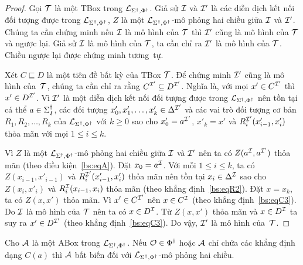 \begin{proof}
	Gọi $\mathcal{T}$ là một TBox trong $\mathcal{L}_{\Sigma^\dag,\Phi^\dag}$. Giả sử $\mathcal{I}$ và $\mathcal{I}'$ là các diễn dịch kết nối đối tượng được trong $\mathcal{L}_{\Sigma^\dag,\Phi^\dag}$, $Z$ là một $\mathcal{L}_{\Sigma^\dag,\Phi^\dag}$-mô phỏng hai chiều giữa $\mathcal{I}$ và $\mathcal{I}'$. Chúng ta cần chứng minh nếu $\mathcal{I}$ là mô hình của $\mathcal{T}$ thì $\mathcal{I}'$ cũng là mô hình của $\mathcal{T}$ và ngược lại. Giả sử $\mathcal{I}$ là mô hình của $\mathcal{T}$, ta cần chỉ ra $\mathcal{I}'$ là mô hình của $\mathcal{T}$. Chiều ngược lại được chứng minh tương~tự.
	
	Xét $C \sqsubseteq D$ là một tiên đề bất kỳ của TBox $\mathcal{T}$. Để chứng minh $\mathcal{I}'$ cũng là mô hình của~$\mathcal{T}$, chúng ta cần chỉ ra rằng $C^{\mathcal{I}'} \subseteq D^{\mathcal{I}'}$. Nghĩa là, với mọi $x' \in C^{\mathcal{I}'}$ thì $x' \in D^{\mathcal{I}'}$. Vì $\mathcal{I}'$ là một diễn dịch kết nối đối tượng được trong $\mathcal{L}_{\Sigma^\dag,\Phi^\dag}$ nên tồn tại cá thể $a \in \Sigma^\dag_I$, các đối tượng $x'_0, x'_1, \ldots, x'_k \in \Delta^{\mathcal{I}'}$ và các vai trò đối tượng cơ bản $R_1, R_2, \ldots, R_k$ của $\mathcal{L}_{\Sigma^\dag,\Phi^\dag}$ với $k \geq 0$ sao cho $x'_0 = a^{\mathcal{I}'}$, $x'_k = x'$ và $R_i^{\mathcal{I}'}(x'_{i-1}, x'_i)$ thỏa mãn với mọi $1 \leq i \leq k$.
	
	Vì $Z$ là một $\mathcal{L}_{\Sigma^\dag,\Phi^\dag}$-mô phỏng hai chiều giữa $\mathcal{I}$ và $\mathcal{I}'$ nên ta có $Z(a^{\mathcal{I}}, a^{\mathcal{I}'})$ thỏa mãn (theo điều kiện~\eqref{bs:eqA}). Đặt $x_0 = a^{\mathcal{I}}$. Với mỗi $1 \leq i \leq k$, ta có $Z(x_{i-1},x'_{i-1})$ và $R_i^{\mathcal{I}'}(x'_{i-1},x'_i)$ thỏa mãn nên tồn tại $x_i \in \Delta^{\mathcal{I}}$ sao cho $Z(x_i, x'_i)$ và $R_i^{\mathcal{I}}(x_{i-1}, x_i)$ thỏa mãn (theo khẳng định~\eqref{bs:eqR2}). Đặt $x=x_k$, ta có $Z(x,x')$ thỏa mãn. Vì $x' \in C^{\mathcal{I}'}$ nên $x \in C^{\mathcal{I}}$ (theo khẳng định~\eqref{bs:eqC3}). Do $\mathcal{I}$ là mô hình của $\mathcal{T}$ nên ta có $x \in D^{\mathcal{I}}$. Từ $Z(x, x')$ thỏa mãn và $x \in D^{\mathcal{I}}$ ta suy ra $x' \in D^{\mathcal{I}'}$ (theo khẳng định~\eqref{bs:eqC3}). Do vậy, $\mathcal{I}'$ là mô hình của~$\mathcal{T}$.
\end{proof}

\begin{Theorem}
\label{th:ABoxInvariant}
	Cho $\mathcal{A}$ là một ABox trong $\mathcal{L}_{\Sigma^\dag,\Phi^\dag}$. Nếu $\mathcal{O} \in \Phi^\dag$ hoặc $\mathcal{A}$ chỉ chứa các khẳng định dạng $C(a)$ thì $\mathcal{A}$ bất biến đối với $\mathcal{L}_{\Sigma^\dag,\Phi^\dag}$-mô phỏng hai chiều.\myend
\end{Theorem}

